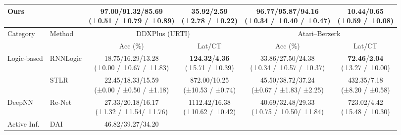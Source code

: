 \documentclass{article} %
\newcommand{\revise}[1]{#1}
\begin{document}
\begin{table}[t]
\begin{tabular}{l l c c c c}
\textbf{Ours} & &
\makecell[c]{\textbf{97.00/91.32/85.69}\\[-3pt]
\revise{{\scriptsize (±0.51 / ±0.79 / ±0.89)}}}
&
\makecell[c]{35.92/2.59\\[-3pt]
\revise{{\scriptsize (±2.78 / ±0.22)}}}
&
\makecell[c]{\textbf{96.77/95.87/94.16}\\[-3pt]
\revise{{\scriptsize (±0.34 / ±0.40 / ±0.47)}}}
&
\makecell[c]{10.44/0.65\\[-3pt]
\revise{{\scriptsize (±0.59 / ±0.08)}}}
\\
\midrule
\multirow{2}{*}{Category} & \multirow{2}{*}{Method}
& \multicolumn{2}{c}{DDXPlus (URTI)} & \multicolumn{2}{c}{Atari--Berzerk} \\
\cmidrule(lr){3-4} \cmidrule(lr){5-6}
& & Acc (\%) & Lat/CT & Acc (\%) & Lat/CT \\
\midrule
\multirow{2}{*}{Logic-based}
& RNNLogic & \makecell[c]{18.75/16.29/13.28\\[-3pt]
\revise{{\scriptsize (±0.00 / ±0.67 / ±1.83)}}} & \makecell[c]{\textbf{124.32}/\textbf{4.36}\\[-3pt]
\revise{{\scriptsize (±5.71 / ±0.39)}}} & \makecell[c]{33.86/27.50/24.38\\[-3pt]
\revise{{\scriptsize (±0.34 / ±0.57 / ±0.37)}}} & \makecell[c]{\textbf{72.46}/\textbf{2.04}\\[-3pt]
\revise{{\scriptsize (±3.27 / ±0.00)}}} \\
& STLR     & \makecell[c]{22.45/18.33/15.59\\[-3pt]
\revise{{\scriptsize (±0.00 / ±0.50 / ±1.18)}}} & \makecell[c]{872.00/10.25\\[-3pt]
\revise{{\scriptsize (±10.53 / ±0.74)}}} & \makecell[c]{45.50/38.72/37.24\\[-3pt]
\revise{{\scriptsize (±0.67 / ±1.83/ ±2.25)}}} & \makecell[c]{432.35/7.18\\[-3pt]
\revise{{\scriptsize (±8.20 / ±0.58)}}} \\
DeepNN & Re-Net & \makecell[c]{27.33/20.18/16.17\\[-3pt]
\revise{{\scriptsize (±1.32 / ±1.54/ ±1.76)}}} & \makecell[c]{1112.42/16.38\\[-3pt]
\revise{{\scriptsize (±10.62 / ±0.42)}}} & \makecell[c]{40.69/32.48/29.33\\[-3pt]
\revise{{\scriptsize (±0.75 / ±0.50/ ±1.84)}}} & \makecell[c]{723.02/4.42\\[-3pt]
\revise{{\scriptsize (±5.48 / ±0.30)}}} \\
\multirow{2}{*}{Active Inf.}
& DAI      & \makecell[c]{46.82/39.27/34.20\\[-3pt]
}
\end{tabular}
\end{table}
\end{document}
